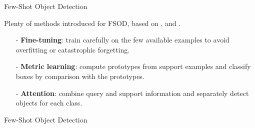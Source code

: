 \begin{subsectionframemod}{Few-Shot Object Detection}

    Plenty of methods introduced for FSOD, based on ,  and . 
    \begin{itemize}
        \item[-] \textbf{Fine-tuning}: train carefully on the few available examples to avoid overfitting or catastrophic forgetting.
        \item[-] \textbf{Metric learning}: compute prototypes from support examples and classify boxes by comparison with the prototypes.
        \item[-] \textbf{Attention}: combine query and support information and separately detect objects for each class.   
    \end{itemize}
    
\end{subsectionframemod}


\begin{subsectionframemod}{Few-Shot Object Detection}
    
    \vspace{-3mm}
    
\end{subsectionframemod}
